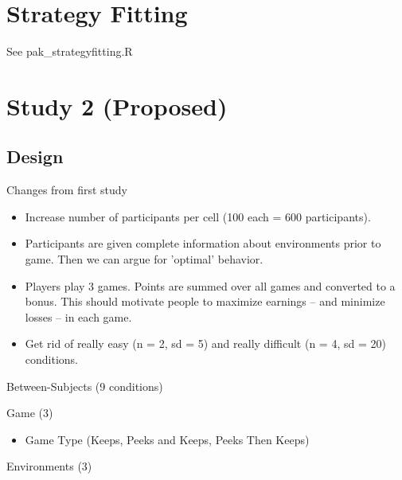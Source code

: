 \documentclass[a4paper,doc,natbib,floatsintext]{apa6}\usepackage[]{graphicx}\usepackage[]{color}
\begin{document}
\section{Strategy Fitting}


See pak_strategyfitting.R











\section{Study 2 (Proposed)}

\subsection{Design}


Changes from first study

\begin{itemize}

  \item Increase number of participants per cell (100 each = 600 participants).
  \item Participants are given complete information about environments prior to game. Then we can argue for 'optimal' behavior.
  \item Players play 3 games. Points are summed over all games and converted to a bonus. This should motivate people to maximize earnings -- and minimize losses -- in each game.
  \item Get rid of really easy (n = 2, sd = 5) and really difficult (n = 4, sd = 20) conditions.
  

\end{itemize}

Between-Subjects (9 conditions)

Game (3)

\begin{itemize}

  \item Game Type (Keeps, Peeks and Keeps, Peeks Then Keeps)

\end{itemize}

Environments (3)
\end{document}
